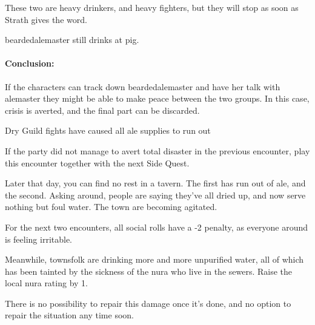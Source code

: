 These two are heavy drinkers, and heavy fighters, but they will stop as soon as  Strath gives the word.


\Gls{beardedalemaster} still drinks at \gls{pig}.  

\paragraph{Conclusion:} If the characters can track down \gls{beardedalemaster} and have her talk with \gls{alemaster} they might be able to make peace between the two groups.
In this case, crisis is averted, and the final part can be discarded.

\beardedalemaster

{\N\squash Dry}%
{Guild fights have caused all ale supplies to run out}%

If the party did not manage to avert total disaster in the previous encounter, play this encounter together with the next Side Quest.

\begin{boxtext}

  Later that day, you can find no rest in a tavern.  The first has run out of ale, and the second.  Asking around, people are saying they've all dried up, and now serve nothing but foul water.  The town are becoming agitated.

\end{boxtext}

For the next two encounters, all social rolls have a -2 penalty, as everyone around is feeling irritable.

Meanwhile, townsfolk are drinking more and more unpurified water, all of which has been tainted by the sickness of the nura who live in the sewers.  Raise the local nura rating by 1.

There is no possibility to repair this damage once it's done, and no option to repair the situation any time soon.

\stopcontents[sq]
